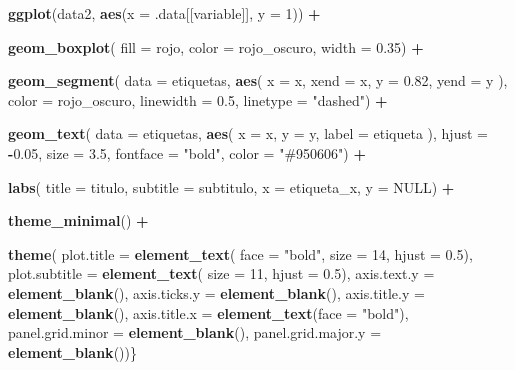 \documentclass[
]{article}
\newenvironment{Shaded}{\begin{snugshade}}{\end{snugshade}}
\newcommand{\AttributeTok}[1]{\textcolor[rgb]{0.13,0.29,0.53}{#1}}
\newcommand{\ConstantTok}[1]{\textcolor[rgb]{0.56,0.35,0.01}{#1}}
\newcommand{\DecValTok}[1]{\textcolor[rgb]{0.00,0.00,0.81}{#1}}
\newcommand{\FloatTok}[1]{\textcolor[rgb]{0.00,0.00,0.81}{#1}}
\newcommand{\FunctionTok}[1]{\textcolor[rgb]{0.13,0.29,0.53}{\textbf{#1}}}
\newcommand{\NormalTok}[1]{#1}
\newcommand{\SpecialCharTok}[1]{\textcolor[rgb]{0.81,0.36,0.00}{\textbf{#1}}}
\newcommand{\StringTok}[1]{\textcolor[rgb]{0.31,0.60,0.02}{#1}}
\begin{document}
\begin{Shaded}
\begin{Highlighting}[]
  \FunctionTok{ggplot}\NormalTok{(data2, }\FunctionTok{aes}\NormalTok{(}\AttributeTok{x =}\NormalTok{ .data[[variable]], }\AttributeTok{y =} \DecValTok{1}\NormalTok{)) }\SpecialCharTok{+}
    
    \FunctionTok{geom\_boxplot}\NormalTok{(}
      \AttributeTok{fill =}\NormalTok{ rojo,}
      \AttributeTok{color =}\NormalTok{ rojo\_oscuro,}
      \AttributeTok{width =} \FloatTok{0.35}\NormalTok{) }\SpecialCharTok{+}
    
    \FunctionTok{geom\_segment}\NormalTok{(}
      \AttributeTok{data =}\NormalTok{ etiquetas,}
      \FunctionTok{aes}\NormalTok{(}
        \AttributeTok{x =}\NormalTok{ x,}
        \AttributeTok{xend =}\NormalTok{ x,}
        \AttributeTok{y =} \FloatTok{0.82}\NormalTok{,}
        \AttributeTok{yend =}\NormalTok{ y}
\NormalTok{      ),}
      \AttributeTok{color =}\NormalTok{ rojo\_oscuro,}
      \AttributeTok{linewidth =} \FloatTok{0.5}\NormalTok{,}
      \AttributeTok{linetype =} \StringTok{"dashed"}\NormalTok{) }\SpecialCharTok{+}
    
    \FunctionTok{geom\_text}\NormalTok{(}
      \AttributeTok{data =}\NormalTok{ etiquetas,}
      \FunctionTok{aes}\NormalTok{(}
        \AttributeTok{x =}\NormalTok{ x,}
        \AttributeTok{y =}\NormalTok{ y,}
        \AttributeTok{label =}\NormalTok{ etiqueta}
\NormalTok{      ),}
      \AttributeTok{hjust =} \SpecialCharTok{{-}}\FloatTok{0.05}\NormalTok{,}
      \AttributeTok{size =} \FloatTok{3.5}\NormalTok{,}
      \AttributeTok{fontface =} \StringTok{"bold"}\NormalTok{,}
      \AttributeTok{color =} \StringTok{"\#950606"}\NormalTok{) }\SpecialCharTok{+}
    
    \FunctionTok{labs}\NormalTok{(}
      \AttributeTok{title =}\NormalTok{ titulo,}
      \AttributeTok{subtitle =}\NormalTok{ subtitulo,}
      \AttributeTok{x =}\NormalTok{ etiqueta\_x,}
      \AttributeTok{y =} \ConstantTok{NULL}\NormalTok{) }\SpecialCharTok{+}
    
    \FunctionTok{theme\_minimal}\NormalTok{() }\SpecialCharTok{+}
    
    \FunctionTok{theme}\NormalTok{(}
      \AttributeTok{plot.title =} \FunctionTok{element\_text}\NormalTok{(}
        \AttributeTok{face =} \StringTok{"bold"}\NormalTok{,}
        \AttributeTok{size =} \DecValTok{14}\NormalTok{,}
        \AttributeTok{hjust =} \FloatTok{0.5}\NormalTok{),}
      \AttributeTok{plot.subtitle =} \FunctionTok{element\_text}\NormalTok{(}
        \AttributeTok{size =} \DecValTok{11}\NormalTok{,}
        \AttributeTok{hjust =} \FloatTok{0.5}\NormalTok{),}
      \AttributeTok{axis.text.y =} \FunctionTok{element\_blank}\NormalTok{(),}
      \AttributeTok{axis.ticks.y =} \FunctionTok{element\_blank}\NormalTok{(),}
      \AttributeTok{axis.title.y =} \FunctionTok{element\_blank}\NormalTok{(),}
      \AttributeTok{axis.title.x =} \FunctionTok{element\_text}\NormalTok{(}\AttributeTok{face =} \StringTok{"bold"}\NormalTok{),}
      \AttributeTok{panel.grid.minor =} \FunctionTok{element\_blank}\NormalTok{(),}
      \AttributeTok{panel.grid.major.y =} \FunctionTok{element\_blank}\NormalTok{())\}}
\end{Highlighting}
\end{Shaded}
\end{document}
